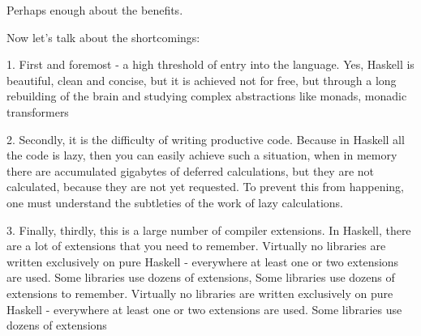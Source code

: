 \documentclass[14pt]{article}
\begin{document}
Perhaps enough about the benefits.  

Now let's talk about the shortcomings: 

1. First and foremost - a high threshold of entry into the language.  Yes, Haskell is beautiful, clean and concise, but it is achieved not for free, but through a long rebuilding of the brain and studying complex abstractions like monads, monadic transformers 

2. Secondly, it is the difficulty of writing productive code.  Because  in Haskell all the code is lazy, then you can easily achieve such a situation, when in memory there are accumulated gigabytes of deferred calculations, but they are not calculated, because they are not yet requested.  To prevent this from happening, one must understand the subtleties of the work of lazy calculations.  

3. Finally, thirdly, this is a large number of compiler extensions.  In Haskell, there are a lot of extensions that you need to remember.  Virtually no libraries are written exclusively on pure Haskell - everywhere at least one or two extensions are used.  Some libraries use dozens of extensions, Some libraries use dozens of extensions to remember.  Virtually no libraries are written exclusively on pure Haskell - everywhere at least one or two extensions are used.  Some libraries use dozens of extensions
\end{document}

